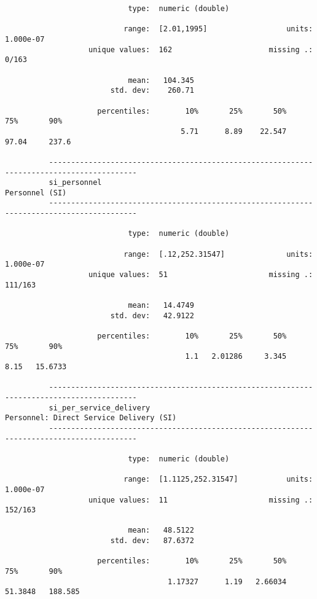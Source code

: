 \documentclass{article}
\begin{document}
\begin{verbatim}
                            type:  numeric (double)
          
                           range:  [2.01,1995]                  units:  1.000e-07
                   unique values:  162                      missing .:  0/163
          
                            mean:   104.345
                        std. dev:    260.71
          
                     percentiles:        10%       25%       50%       75%       90%
                                        5.71      8.89    22.547     97.04     237.6
          
          ------------------------------------------------------------------------------------------
          si_personnel                                                                Personnel (SI)
          ------------------------------------------------------------------------------------------
          
                            type:  numeric (double)
          
                           range:  [.12,252.31547]              units:  1.000e-07
                   unique values:  51                       missing .:  111/163
          
                            mean:   14.4749
                        std. dev:   42.9122
          
                     percentiles:        10%       25%       50%       75%       90%
                                         1.1   2.01286     3.345      8.15   15.6733
          
          ------------------------------------------------------------------------------------------
          si_per_service_delivery                            Personnel: Direct Service Delivery (SI)
          ------------------------------------------------------------------------------------------
          
                            type:  numeric (double)
          
                           range:  [1.1125,252.31547]           units:  1.000e-07
                   unique values:  11                       missing .:  152/163
          
                            mean:   48.5122
                        std. dev:   87.6372
          
                     percentiles:        10%       25%       50%       75%       90%
                                     1.17327      1.19   2.66034   51.3848   188.585
          

\end{verbatim}
\end{document}
